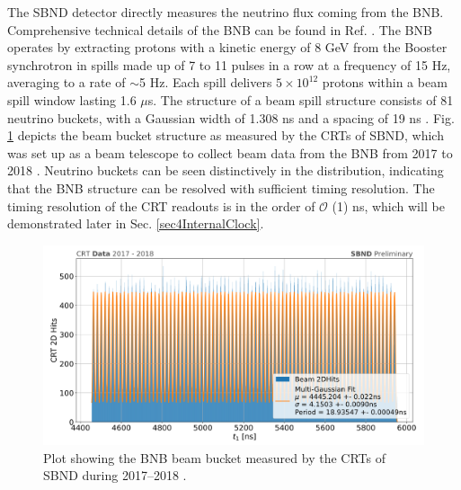 The SBND detector directly measures the neutrino flux coming from the BNB.                                                                                                                  
Comprehensive technical details of the BNB can be found in Ref. \cite{BNBMiniBooNE}.                                                                                                      
The BNB operates by extracting protons with a kinetic energy of 8 GeV from the Booster synchrotron in spills made up of 7 to 11 pulses in a row at a frequency of 15 Hz, averaging to a rate of $\sim$5 Hz.                                                                                                                                                                                        
Each spill delivers $5 \times 10^{12}$ protons within a beam spill window lasting 1.6 $\mu$s.                                                                                               
The structure of a beam spill structure consists of 81 neutrino buckets, with a Gaussian width of 1.308 ns and a spacing of 19 ns \cite{BNBsigma}.                                          
Fig. \ref{fig:CRT2017} depicts the beam bucket structure as measured by the CRTs of SBND, which was set up as a beam telescope to collect beam data from the BNB from 2017 to 2018 \cite{CPAD2022}.                         
Neutrino buckets can be seen distinctively in the distribution, indicating that the BNB structure can be resolved with sufficient timing resolution.                              
The timing resolution of the CRT readouts is in the order of $\mathcal{O}$ (1) ns, which will be demonstrated later in Sec. \ref{sec4InternalClock}.

\begin{figure}[t] 
\centering    
\includegraphics[width=1.0\textwidth]{CRT2017}
\caption[BNB Beam Bucket Measured By SBND CRTs in 2017-2018]{
Plot showing the BNB beam bucket measured by the CRTs of SBND during 2017--2018 \cite{CPAD2022}.
}
\label{fig:CRT2017}
\end{figure}

